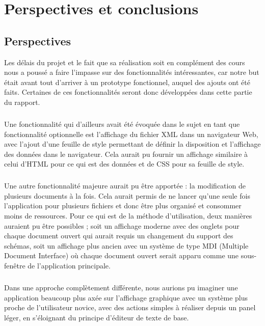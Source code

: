 \chapter{Perspectives et conclusions}

\section{Perspectives}
Les délais du projet et le fait que sa réalisation soit en complément des cours nous a poussé a faire l'impasse sur des fonctionnalités intéressantes, car notre but était avant tout d'arriver à un prototype fonctionnel, auquel des ajouts ont été faits. Certaines de ces fonctionnalités seront donc développées dans cette partie du rapport.
\paragraph{}

Une fonctionnalité qui d'ailleurs avait été évoquée dans le sujet en tant que fonctionnalité optionnelle est l'affichage du fichier XML dans un navigateur Web, avec l'ajout d'une feuille de style permettant de définir la disposition et l'affichage des données dans le navigateur. Cela aurait pu fournir un affichage similaire à celui d'HTML pour ce qui est des données et de CSS pour sa feuille de style.
\paragraph{}

Une autre fonctionnalité majeure aurait pu être apportée : la modification de plusieurs documents à la fois. Cela aurait permis de ne lancer qu'une seule fois l'application pour plusieurs fichiers et donc être plus organisé et consommer moins de ressources. Pour ce qui est de la méthode d'utilisation, deux manières auraient pu être possibles ; soit un affichage moderne avec des onglets pour chaque document ouvert qui aurait requis un changement du support des schémas, soit un affichage plus ancien avec un système de type MDI (Multiple Document Interface) où chaque document ouvert serait apparu comme une sous-fenêtre de l'application principale.
\paragraph{}

Dans une approche complètement différente, nous aurions pu imaginer une application beaucoup plus axée sur l'affichage graphique avec un système plus proche de l'utilisateur novice, avec des actions simples à réaliser depuis un panel léger, en s'éloignant du principe d'éditeur de texte de base.

